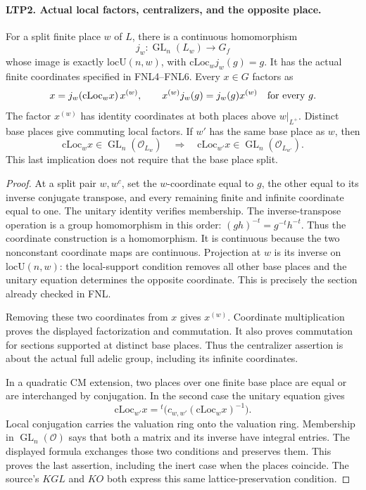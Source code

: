 \documentclass[11pt,a4paper]{article}
\numberwithin{equation}{section}
\theoremstyle{remark}\newtheorem{remark}[theorem]{Remark}
\begin{document}
\paragraph{LTP2. Actual local factors, centralizers, and the opposite place.}
\label{claim:LTP2}
For a split finite place \(w\) of \(L\), there is a continuous
homomorphism
\[
       j_w:\operatorname{GL}_n(L_w)\longrightarrow G_f
\]
whose image is exactly \(\mathrm{locU}(n,w)\), with
\(\mathrm{cLoc}_w j_w(g)=g\).  It has the actual finite coordinates
specified in FNL4--FNL6.  Every \(x\in G\) factors as
\[
       x=j_w(\mathrm{cLoc}_w x)\,x^{(w)},
             \qquad x^{(w)}j_w(g)=j_w(g)x^{(w)}
                                     \quad\hbox{for every }g.
\]
The factor \(x^{(w)}\) has identity coordinates at both places above
\(w|_{L^+}\).  Distinct base places give commuting local factors.
If \(w'\) has the same base place as \(w\), then
\[
 \mathrm{cLoc}_w x\in\operatorname{GL}_n(\mathcal O_{L_w})
 \quad\Longrightarrow\quad
 \mathrm{cLoc}_{w'}x\in\operatorname{GL}_n(\mathcal O_{L_{w'}}).
\]
This last implication does not require that the base place split.
\begin{proof}
At a split pair \(w,w^c\), set the \(w\)-coordinate equal to \(g\),
the other equal to its inverse conjugate transpose, and every
remaining finite and infinite coordinate equal to one.  The unitary
identity verifies membership.  The inverse-transpose operation is
a group homomorphism in this order:
\((gh)^{-t}=g^{-t}h^{-t}\).  Thus the coordinate construction is a
homomorphism.  It is continuous because the two nonconstant
coordinate maps are continuous.  Projection at \(w\) is its inverse
on \(\mathrm{locU}(n,w)\): the local-support condition removes all
other base places and the unitary equation determines the opposite
coordinate.  This is precisely the section already checked in FNL.

Removing these two coordinates from \(x\) gives \(x^{(w)}\).
Coordinate multiplication proves the displayed factorization and
commutation.  It also proves commutation for sections supported at
distinct base places.  Thus the centralizer assertion is about the
actual full adelic group, including its infinite coordinates.

In a quadratic CM extension, two places over one finite base place
are equal or are interchanged by conjugation.  In the second case
the unitary equation gives
\[
 \mathrm{cLoc}_{w'}x
       ={}^t\!\bigl(c_{w,w'}(\mathrm{cLoc}_w x)^{-1}\bigr).
\]
Local conjugation carries the valuation ring onto the valuation
ring.  Membership in \(\operatorname{GL}_n(\mathcal O)\) says that
both a matrix and its inverse have integral entries.  The displayed
formula exchanges those two conditions and preserves them.
This proves the last assertion, including the inert case when the
places coincide.  The source's \(KGL\) and \(KO\) both express this
same lattice-preservation condition.
\end{proof}
\end{document}
